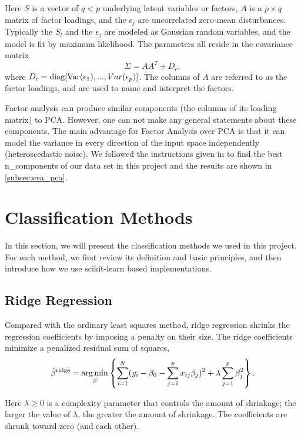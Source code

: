 \documentclass[10pt,journal,compsoc]{IEEEtran}
\DeclareMathOperator*{\argmin}{arg\,min}
\begin{document}
Here $S$ is a vector of $q < p$ underlying latent variables or factors, $A$ is a $p \times q$ matrix of factor loadings, and the $\epsilon_j$ are uncorrelated zero-mean disturbances. Typically the $S_l$ and the $\epsilon_j$ are modeled as Gaussian random variables, and the model is fit by maximum likelihood. The parameters all reside in the covariance matrix
\begin{equation}
  \Sigma = AA^T + D_{\epsilon},
\end{equation}
where $D_{\epsilon} = {\rm diag}[{\rm Var}(\epsilon_1),...,Var(\epsilon_p)]$. The columns of $A$ are referred to as the  factor loadings, and are used to name and interpret the factors.

Factor analysis can produce similar components (the columns of its loading matrix) to PCA. However, one can not make any general statements about these components. The main advantage for Factor Analysis over PCA is that it can model the variance in every direction of the input space independently (heteroscedastic noise). We followed the instructions given in \cite{pcavsfa} to find the best n\_components of our data set in this project and the results are shown in \ref{subsec:eva_pca}.

\section{Classification Methods}
\label{sec:classification_methods}
In this section, we will present the classification methods we used in this project. For each method, we first review its definition and basic principles, and then introduce how we use scikit-learn\cite{scikit-learn} based implementations.

\subsection{Ridge Regression}
\label{subsec:ridge_regression}
Compared with the ordinary least squares method, ridge regression shrinks the regression coefficients by imposing a penalty on their size. The ridge coefficients minimize a penalized residual sum of squares,
\begin{equation}
  \label{eq:ridge_regression}
  \hat{\beta}^{\rm ridge} = \argmin_{\beta}\left\{\sum_{i=1}^N(y_i - \beta_0 - \sum_{j=1}^px_{ij}\beta_j)^2 + \lambda\sum_{j=1}^p\beta_j^2\right\}.
\end{equation}

Here $\lambda \geq 0$ is a complexity parameter that controls the amount of shrinkage; the larger the value of $\lambda$, the greater the amount of shrinkage. The coefficients are shrunk toward zero (and each other)\cite{friedman2001elements}.
\end{document}
